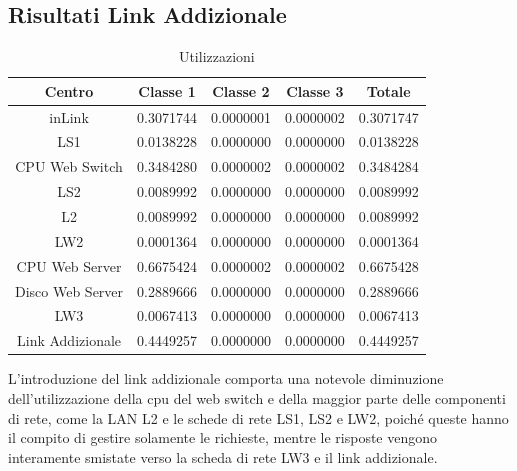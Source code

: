 \subsection{Risultati Link Addizionale}
\begin{table}[htbp]
\begin{center}
\begin{tabular}{|c|c|c|c|c|}
\hline
Centro	&Classe 1	&Classe 2	&Classe 3	&Totale\\
\hline
\hline
inLink & 0.3071744 & 0.0000001 & 0.0000002 & 0.3071747 \\ \hline
LS1 & 0.0138228 & 0.0000000 & 0.0000000 & 0.0138228 \\ \hline
CPU Web Switch & 0.3484280 & 0.0000002 & 0.0000002 & 0.3484284 \\ \hline
LS2 & 0.0089992 & 0.0000000 & 0.0000000 & 0.0089992 \\ \hline
L2 & 0.0089992 & 0.0000000 & 0.0000000 & 0.0089992 \\ \hline
LW2 & 0.0001364 & 0.0000000 & 0.0000000 & 0.0001364 \\ \hline
CPU Web Server & 0.6675424 & 0.0000002 & 0.0000002 & 0.6675428 \\ \hline
Disco Web Server & 0.2889666 & 0.0000000 & 0.0000000 & 0.2889666 \\ \hline
LW3 & 0.0067413 & 0.0000000 & 0.0000000 & 0.0067413 \\ \hline
Link Addizionale & 0.4449257 & 0.0000000 & 0.0000000 & 0.4449257 \\ \hline
\end{tabular}
\end{center}
\caption{Utilizzazioni}
\label{utilizzazioni}
\end{table}
L'introduzione del link addizionale comporta una notevole diminuzione dell'utilizzazione della cpu del web switch e  della maggior parte delle componenti di rete, come la LAN L2 e le schede di rete LS1, LS2 e LW2, poiché queste hanno il compito di gestire solamente le richieste, mentre le risposte  vengono interamente smistate verso la scheda di rete LW3 e il link addizionale.
